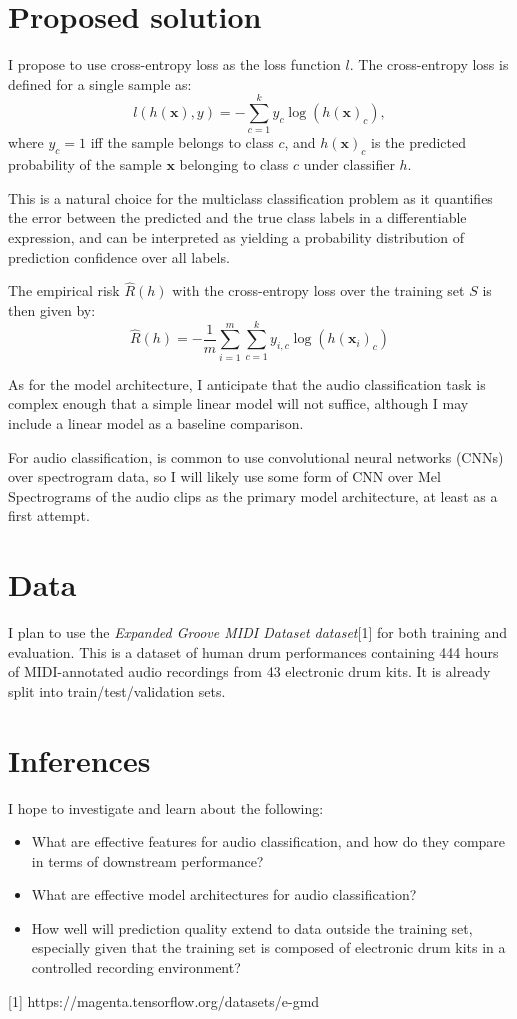 \documentclass{article}
\begin{document}
\section{Proposed solution}

I propose to use cross-entropy loss as the loss function \( l \). The cross-entropy loss is defined for a single sample as:
\[l(h(\mathbf{x}), y) = -\sum_{c=1}^k y_c \log(h(\mathbf{x})_c),\]
where \( y_c = 1 \) iff the sample belongs to class \( c \), and \( h(\mathbf{x})_c \) is the predicted probability of the sample \( \mathbf{x} \) belonging to class \( c \) under classifier \( h \).

This is a natural choice for the multiclass classification problem as it quantifies the error between the predicted and the true class labels in a differentiable expression, and can be interpreted as yielding a probability distribution of prediction confidence over all labels.

The empirical risk \( \hat{R}(h) \) with the cross-entropy loss over the training set \( S \) is then given by:
\[ \hat{R}(h) = -\frac{1}{m} \sum_{i=1}^m \sum_{c=1}^k y_{i,c} \log(h(\mathbf{x}_i)_c) \]

As for the model architecture, I anticipate that the audio classification task is complex enough that a simple linear model will not suffice, although I may include a linear model as a baseline comparison.

For audio classification, is common to use convolutional neural networks (CNNs) over spectrogram data, so I will likely use some form of CNN over Mel Spectrograms of the audio clips as the primary model architecture, at least as a first attempt.

\section{Data}

I plan to use the \textit{Expanded Groove MIDI Dataset dataset}[1] for both training and evaluation.
This is a dataset of human drum performances containing 444 hours of MIDI-annotated audio recordings from 43 electronic drum kits.
It is already split into train/test/validation sets.

\section{Inferences}

I hope to investigate and learn about the following:
\begin{itemize}
    \item What are effective features for audio classification, and how do they compare in terms of downstream performance?
    \item What are effective model architectures for audio classification?
    \item How well will prediction quality extend to data outside the training set, especially given that the training set is composed of electronic drum kits in a controlled recording environment?
\end{itemize}

[1] https://magenta.tensorflow.org/datasets/e-gmd
\end{document}

